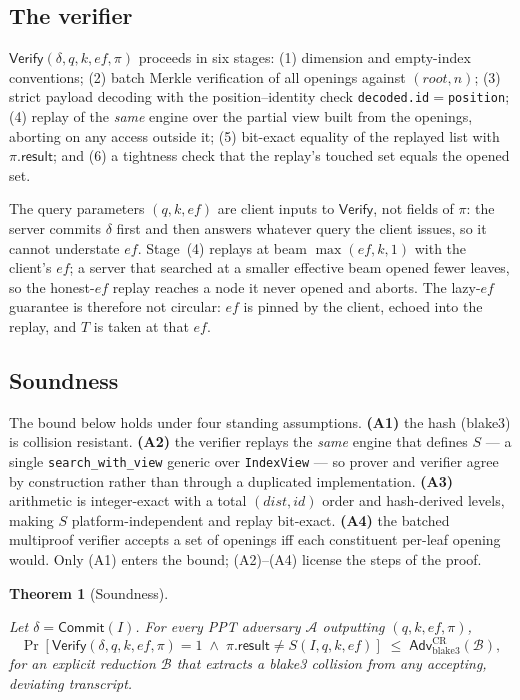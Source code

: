 \documentclass[11pt]{article}
\newtheorem{theorem}{Theorem}
\begin{document}
\subsection{The verifier}

$\mathsf{Verify}(\delta,q,k,\mathit{ef},\pi)$ proceeds in six stages:
(1) dimension and empty-index conventions; (2) batch Merkle verification
of all openings against $(\mathit{root},n)$; (3) strict payload decoding
with the position--identity check
\texttt{decoded.id}${=}$\texttt{position}; (4) replay of the \emph{same}
engine over the partial view built from the openings, aborting on any
access outside it; (5) bit-exact equality of the replayed list with
$\pi.\mathsf{result}$; and (6) a tightness check that the replay's
touched set equals the opened set.

The query parameters $(q,k,\mathit{ef})$ are client inputs to
$\mathsf{Verify}$, not fields of $\pi$: the server commits $\delta$
first and then answers whatever query the client issues, so it cannot
understate $\mathit{ef}$. Stage~(4) replays at beam
$\max(\mathit{ef},k,1)$ with the client's $\mathit{ef}$; a server that
searched at a smaller effective beam opened fewer leaves, so the
honest-$\mathit{ef}$ replay reaches a node it never opened and aborts.
The lazy-$\mathit{ef}$ guarantee is therefore not circular:
$\mathit{ef}$ is pinned by the client, echoed into the replay, and $T$
is taken at that $\mathit{ef}$.

\subsection{Soundness}

The bound below holds under four standing assumptions. \textbf{(A1)} the
hash (blake3) is collision resistant. \textbf{(A2)} the verifier replays
the \emph{same} engine that defines $S$ --- a single
\texttt{search\_with\_view} generic over \texttt{IndexView} --- so
prover and verifier agree by construction rather than through a
duplicated implementation. \textbf{(A3)} arithmetic is integer-exact
with a total $(\mathit{dist},\mathit{id})$ order and hash-derived
levels, making $S$ platform-independent and replay bit-exact.
\textbf{(A4)} the batched multiproof verifier accepts a set of openings
iff each constituent per-leaf opening would. Only (A1) enters the bound;
(A2)--(A4) license the steps of the proof.

\begin{theorem}[Soundness]\label{thm:soundness}

Let $\delta=\mathsf{Commit}(I)$. For every PPT adversary $\mathcal{A}$
outputting $(q,k,\mathit{ef},\pi)$,
\[
\Pr\!\left[\mathsf{Verify}(\delta,q,k,\mathit{ef},\pi)=1 \;\wedge\; \pi.\mathsf{result}\neq S(I,q,k,\mathit{ef})\right] \;\le\; \mathsf{Adv}^{\mathrm{CR}}_{\mathrm{blake3}}(\mathcal{B}),
\]
for an explicit reduction $\mathcal{B}$ that extracts a blake3 collision
from any accepting, deviating transcript.

\end{theorem}
\end{document}
